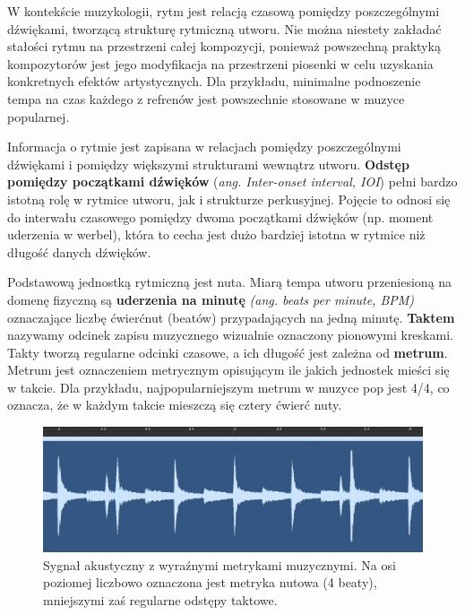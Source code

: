 \documentclass[12pt,a4paper,twoside]{mwart}
\begin{document}
W kontekście muzykologii, rytm jest relacją czasową pomiędzy poszczególnymi dźwiękami, tworzącą strukturę rytmiczną utworu. Nie można niestety zakładać stałości rytmu na przestrzeni całej kompozycji, ponieważ powszechną praktyką kompozytorów jest jego modyfikacja na przestrzeni piosenki w celu uzyskania konkretnych efektów artystycznych. Dla przykładu, minimalne podnoszenie tempa na czas każdego z refrenów jest powszechnie stosowane w muzyce popularnej.

Informacja o rytmie jest zapisana w relacjach pomiędzy poszczególnymi dźwiękami i pomiędzy większymi strukturami wewnątrz utworu. \textbf{Odstęp pomiędzy początkami dźwięków} (\textit{ang. Inter-onset interval, IOI}) pełni bardzo istotną rolę w rytmice utworu, jak i strukturze perkusyjnej. Pojęcie to odnosi się do interwału czasowego pomiędzy dwoma początkami dźwięków (np. moment uderzenia w werbel), która to cecha jest dużo bardziej istotna w rytmice niż długość danych dźwięków. \cite[473-500]{Transcription:Clarke:RhythmAndTiming}

Podstawową jednostką rytmiczną jest nuta. Miarą tempa utworu przeniesioną na domenę fizyczną są \textbf{uderzenia na minutę} \textit{(ang. beats per minute, BPM)} oznaczające liczbę ćwierćnut (beatów) przypadających na jedną minutę. \textbf{Taktem} nazywamy odcinek zapisu muzycznego wizualnie oznaczony pionowymi kreskami. Takty tworzą regularne odcinki czasowe, a ich długość jest zależna od \textbf{metrum}. Metrum jest oznaczeniem metrycznym opisującym ile jakich jednostek mieści się w takcie. Dla przykładu, najpopularniejszym metrum w muzyce pop jest 4/4, co oznacza, że w każdym takcie mieszczą się cztery ćwierć nuty.

\begin{figure}[H]
  \begin{center}
    \includegraphics[scale=0.3]{images/RythmMertic.jpg}
    \caption{Sygnał akustyczny z wyraźnymi metrykami muzycznymi. Na osi poziomej liczbowo oznaczona jest metryka nutowa (4 beaty), mniejszymi zaś regularne odstępy taktowe.}
    \label{fig:rythmMertic}
  \end{center}
\end{figure}
\end{document}
